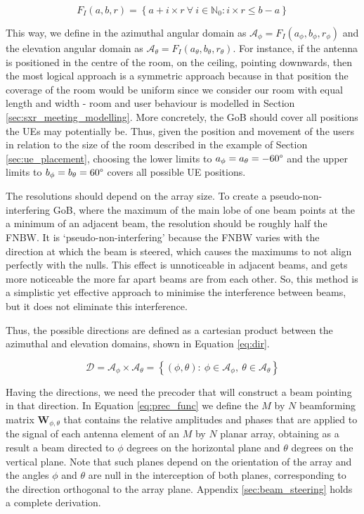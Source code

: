 \begin{equation} \label{eq:inter_func}
    F_I(a, b, r) = \left\{a + i \times r \  \forall \ i \in \mathbb{N}_0: i \times r \leq b-a \right\}
\end{equation}

This way, we define in the azimuthal angular domain as $\mathcal{A}_\phi = F_I(a_\phi, b_\phi, r_\phi)$ and the elevation angular domain as $\mathcal{A}_\theta = F_I(a_\theta, b_\theta, r_\theta)$. For instance, if the antenna is positioned in the centre of the room, on the ceiling, pointing downwards, then the most logical approach is a symmetric approach because in that position the coverage of the room would be uniform since we consider our room with equal length and width - room and user behaviour is modelled in Section \ref{sec:sxr_meeting_modelling}. More concretely, the GoB should cover all positions the UEs may potentially be. Thus, given the position and movement of the users in relation to the size of the room described in the example of Section \ref{sec:ue_placement}, choosing the lower limits to $a_\phi = a_\theta = -60\text{\textdegree}$ and the upper limits to $b_\phi = b_\theta = 60\text{\textdegree}$ covers all possible UE positions.

The resolutions should depend on the array size. To create a pseudo-non-interfering GoB, where the maximum of the main lobe of one beam points at the a minimum of an adjacent beam, the resolution should be roughly half the \ac{FNBW}. It is `pseudo-non-interfering' because the \ac{FNBW} varies with the direction at which the beam is steered, which causes the maximums to not align perfectly with the nulls. This effect is unnoticeable in adjacent beams, and gets more noticeable the more far apart beams are from each other. So, this method is a simplistic yet effective approach to minimise the interference between beams, but it does not eliminate this interference. 

Thus, the possible directions are defined as a cartesian product between the azimuthal and elevation domains, shown in Equation \eqref{eq:dir}.

\begin{equation} \label{eq:dir}
    \mathcal{D} = \mathcal{A}_\phi \times \mathcal{A}_\theta = \left\{(\phi, \theta) : \ \phi \in \mathcal{A}_\phi , \ \theta \in \mathcal{A}_\theta\right\}
\end{equation}


Having the directions, we need the precoder that will construct a beam pointing in that direction. In Equation \eqref{eq:prec_func} we define the $M$ by $N$ beamforming matrix $\bm{W}_{\phi, \theta}$ that contains the relative amplitudes and phases that are applied to the signal of each antenna element of an $M$ by $N$ planar array, obtaining as a result a beam directed to $\phi$ degrees on the horizontal plane and $\theta$ degrees on the vertical plane. Note that such planes depend on the orientation of the array and the angles $\phi$ and $\theta$ are null in the interception of both planes, corresponding to the direction orthogonal to the array plane. Appendix \ref{sec:beam_steering} holds a complete derivation.


